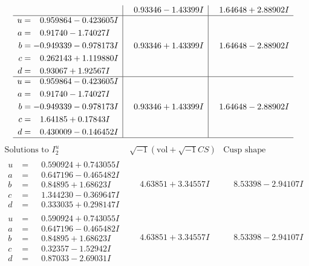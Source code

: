 \documentclass[1p]{elsarticle_modified}
\theoremstyle{definition}
\newcommand{\I}{\sqrt{-1}}
\begin{document}
$$\begin{array}{c|c|c}
 & \phantom{-}0.93346 - 1.43399 I & \phantom{-}1.64648 + 2.88902 I \\ \hline\begin{aligned}
u &= \phantom{-}0.959864 - 0.423605 I \\
a &= \phantom{-}0.91740 - 1.74027 I \\
b &= -0.949339 - 0.978173 I \\
c &= \phantom{-}0.262143 + 1.119880 I \\
d &= \phantom{-}0.93067 + 1.92567 I\end{aligned}
 & \phantom{-}0.93346 + 1.43399 I & \phantom{-}1.64648 - 2.88902 I \\ \hline\begin{aligned}
u &= \phantom{-}0.959864 - 0.423605 I \\
a &= \phantom{-}0.91740 - 1.74027 I \\
b &= -0.949339 - 0.978173 I \\
c &= \phantom{-}1.64185 + 0.17843 I \\
d &= \phantom{-}0.430009 - 0.146452 I\end{aligned}
 & \phantom{-}0.93346 + 1.43399 I & \phantom{-}1.64648 - 2.88902 I\\
 \hline 
 \end{array}$$\newpage$$\begin{array}{c|c|c}  
\text{Solutions to }I^u_{2}& \I (\text{vol} + \sqrt{-1}CS) & \text{Cusp shape}\\
 \hline 
\begin{aligned}
u &= \phantom{-}0.590924 + 0.743055 I \\
a &= \phantom{-}0.647196 - 0.465482 I \\
b &= \phantom{-}0.84895 + 1.68623 I \\
c &= \phantom{-}1.344230 - 0.369647 I \\
d &= \phantom{-}0.333035 + 0.298147 I\end{aligned}
 & \phantom{-}4.63851 + 3.34557 I & \phantom{-}8.53398 - 2.94107 I \\ \hline\begin{aligned}
u &= \phantom{-}0.590924 + 0.743055 I \\
a &= \phantom{-}0.647196 - 0.465482 I \\
b &= \phantom{-}0.84895 + 1.68623 I \\
c &= \phantom{-}0.32357 - 1.52942 I \\
d &= \phantom{-}0.87033 - 2.69031 I\end{aligned}
 & \phantom{-}4.63851 + 3.34557 I & \phantom{-}8.53398 - 2.94107 I \\ \hline\begin{aligned}

\end{aligned}
\end{array}$$
\end{document}
